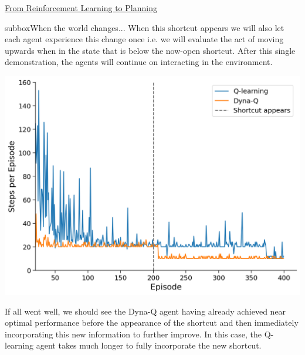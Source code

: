 \begin{textbox}{\href{https://compneuro.neuromatch.io/tutorials/W3D4_ReinforcementLearning/student/W3D4_Tutorial4.html}{From Reinforcement Learning to Planning } }
\begin{subbox}{subbox}{When the world changes...}
When this shortcut appears we will also let each agent experience this change once i.e. we will evaluate the act of moving upwards when in the state that is below the now-open shortcut. After this single demonstration, the agents will continue on interacting in the environment.
\begin{center}
    
\includegraphics[scale=0.14]{Figures/RL/RL_Figure20.png}
\end{center}

If all went well, we should see the Dyna-Q agent having already achieved near optimal performance before the appearance of the shortcut and then immediately incorporating this new information to further improve. In this case, the Q-learning agent takes much longer to fully incorporate the new shortcut.


\end{subbox}
\end{textbox}
